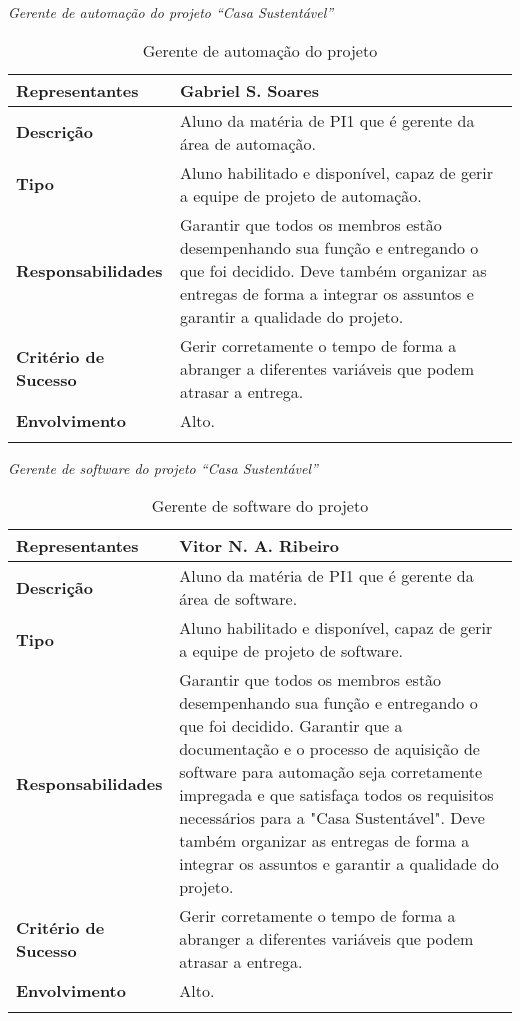 \textit{Gerente de automação do projeto “Casa Sustentável”}

\begin{longtable}{|m{5cm}|m{10cm}|}
	\hline \textbf{Representantes} & Gabriel S. Soares\\
	\hline \textbf{Descrição} & Aluno da matéria de PI1 que é gerente da área de automação.\\
	\hline \textbf{Tipo} & Aluno habilitado e disponível, capaz de gerir a equipe de projeto de automação.\\
	\hline \textbf{Responsabilidades} & Garantir que todos os membros estão desempenhando sua função e entregando o que
	 foi decidido. Deve também organizar as entregas de forma a integrar os assuntos e garantir a qualidade do projeto.\\
	\hline \textbf{Critério de Sucesso} & Gerir corretamente o tempo de forma a abranger a diferentes variáveis que
	podem atrasar a entrega.\\
	\hline \textbf{Envolvimento} & Alto.\\
	\hline
\caption{Gerente de automação do projeto}
\label{Gerente_de_automacao_do_projeto}
\end{longtable}

\textit{Gerente de software do projeto “Casa Sustentável”}

\begin{longtable}{|m{5cm}|m{10cm}|}
	\hline \textbf{Representantes} & Vitor N. A. Ribeiro\\
	\hline \textbf{Descrição} & Aluno da matéria de PI1 que é gerente da área de software.\\
	\hline \textbf{Tipo} & Aluno habilitado e disponível, capaz de gerir a equipe de projeto de software.\\
	\hline \textbf{Responsabilidades} & Garantir que todos os membros estão desempenhando sua função e entregando o que
	 foi decidido. Garantir que a documentação e o processo de aquisição de software para automação seja corretamente
	 impregada e que satisfaça todos os requisitos necessários para a "Casa Sustentável". Deve também organizar as
	 entregas de forma a integrar os assuntos e garantir a qualidade do projeto.\\
	\hline \textbf{Critério de Sucesso} & Gerir corretamente o tempo de forma a abranger a diferentes variáveis que
	podem atrasar a entrega.\\
	\hline \textbf{Envolvimento} & Alto.\\
	\hline
\caption{Gerente de software do projeto}
\label{Gerente_de_software_do_projeto}
\end{longtable}

